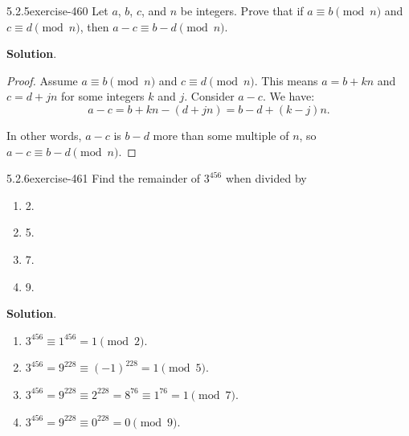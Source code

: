 \documentclass[twoside,11pt,]{book}
\numberwithin{equation}{chapter}
\begin{document}
\begin{divisionsolution}{5.2.5}{}{exercise-460}%
\hypertarget{p-5276}{}%
Let \(a\), \(b\), \(c\), and \(n\) be integers. Prove that if \(a \equiv b \pmod{n}\) and \(c \equiv d \pmod{n}\), then \(a-c \equiv b-d \pmod{n}\).%
\par\smallskip%
\noindent\textbf{Solution}.\quad%
\begin{proof}{}
\hypertarget{p-5277}{}%
Assume \(a \equiv b \pmod n\) and \(c \equiv d \pmod n\). This means \(a = b + kn\) and \(c = d + jn\) for some integers \(k\) and \(j\). Consider \(a-c\). We have:%
\begin{equation*}
a-c = b+kn - (d+jn) = b-d + (k-j)n\text{.}
\end{equation*}
%
\par
\hypertarget{p-5278}{}%
In other words, \(a-c\) is \(b-d\) more than some multiple of \(n\), so \(a-c \equiv b-d \pmod n\).%
\end{proof}
\end{divisionsolution}%
\begin{divisionsolution}{5.2.6}{}{exercise-461}%
\hypertarget{p-5279}{}%
Find the remainder of \(3^{456}\) when divided by\leavevmode%
\begin{multicols}{4}
\begin{enumerate}[label=(\alph*)]
\item\hypertarget{li-2521}{}\hypertarget{p-5280}{}%
2.%
\item\hypertarget{li-2522}{}\hypertarget{p-5281}{}%
5.%
\item\hypertarget{li-2523}{}\hypertarget{p-5282}{}%
7.%
\item\hypertarget{li-2524}{}\hypertarget{p-5283}{}%
9.%
\end{enumerate}
\end{multicols}
%
\par\smallskip%
\noindent\textbf{Solution}.\quad%
\hypertarget{p-5284}{}%
\leavevmode%
\begin{enumerate}[label=(\alph*)]
\item\hypertarget{li-2525}{}\(3^{456} \equiv 1^{456} = 1 \pmod 2\).%
\item\hypertarget{li-2526}{}\(3^{456} = 9^{228} \equiv (-1)^{228} = 1 \pmod{5}\).%
\item\hypertarget{li-2527}{}\(3^{456} = 9^{228} \equiv 2^{228} = 8^{76} \equiv 1^{76} = 1 \pmod 7\).%
\item\hypertarget{li-2528}{}\(3^{456} = 9^{228} \equiv 0^{228} = 0 \pmod{9}\).%
\end{enumerate}
%
\end{divisionsolution}%
\end{document}
